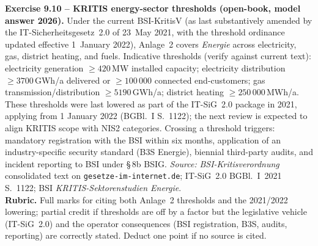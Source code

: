 \documentclass[11pt,a4paper]{article}
\begin{document}
\begin{solutionbox}
\textbf{Exercise 9.10 -- KRITIS energy-sector thresholds (open-book, model answer 2026).}
Under the current BSI-KritisV (as last substantively amended by the IT-Sicherheitsgesetz~2.0 of 23~May 2021, with the threshold ordinance updated effective 1~January 2022), Anlage~2 covers \emph{Energie} across electricity, gas, district heating, and fuels. Indicative thresholds (verify against current text): electricity generation $\geq 420$\,MW installed capacity; electricity distribution $\geq 3700$\,GWh/a delivered or $\geq 100\,000$ connected end-customers; gas transmission/distribution $\geq 5190$\,GWh/a; district heating $\geq 250\,000$\,MWh/a. These thresholds were last lowered as part of the IT-SiG~2.0 package in 2021, applying from 1 January 2022 (BGBl.\ I S.~1122); the next review is expected to align KRITIS scope with NIS2 categories. Crossing a threshold triggers: mandatory registration with the BSI within six months, application of an industry-specific security standard (B3S Energie), biennial third-party audits, and incident reporting to BSI under \S\,8b BSIG. \emph{Source:} \emph{BSI-Kritisverordnung} consolidated text on \texttt{gesetze-im-internet.de}; IT-SiG~2.0 BGBl.\ I~2021 S.~1122; BSI \emph{KRITIS-Sektorenstudien Energie}.
\\\textbf{Rubric.} Full marks for citing both Anlage~2 thresholds and the 2021/2022 lowering; partial credit if thresholds are off by a factor but the legislative vehicle (IT-SiG~2.0) and the operator consequences (BSI registration, B3S, audits, reporting) are correctly stated. Deduct one point if no source is cited.
\end{solutionbox}
\end{document}
